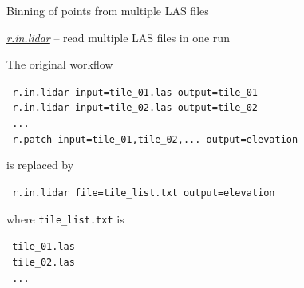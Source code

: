 \documentclass[xcolor={dvipsnames,usenames},beamer,aspectratio=169]{beamer}
\newcommand{\gmodule}[1]{\href{http://grass.osgeo.org/grass71/manuals/#1.html}{\emph{#1}}}
\begin{document}
\begin{frame}{Binning of points from multiple LAS files}

\gmodule{r.in.lidar} -- read multiple LAS files in one run

\bigskip
\small

The original workflow

\smallskip

\texttt{ r.in.lidar input=tile\_01.las output=tile\_01}\\
\texttt{ r.in.lidar input=tile\_02.las output=tile\_02}\\
\texttt{ ...}\\
\texttt{ r.patch input=tile\_01,tile\_02,... output=elevation}\\

\smallskip

is replaced by

\smallskip

\alert{
\texttt{ r.in.lidar file=tile\_list.txt output=elevation}\\
}

\smallskip

where \texttt{tile\_list.txt} is

\smallskip

\texttt{ tile\_01.las}\\
\texttt{ tile\_02.las}\\
\texttt{ ...}\\

\end{frame}




\end{document}
